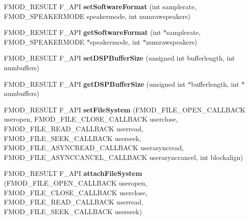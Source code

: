 \begin{DoxyCompactItemize}
\item 
\hypertarget{class_f_m_o_d_1_1_system_af45d03004a533319b4c56e2f13158531}{F\+M\+O\+D\+\_\+\+R\+E\+S\+U\+L\+T F\+\_\+\+A\+P\+I {\bfseries set\+Software\+Format} (int samplerate, F\+M\+O\+D\+\_\+\+S\+P\+E\+A\+K\+E\+R\+M\+O\+D\+E speakermode, int numrawspeakers)}\label{class_f_m_o_d_1_1_system_af45d03004a533319b4c56e2f13158531}

\item 
\hypertarget{class_f_m_o_d_1_1_system_a429d3d9c082329c16a5a827a9beab19f}{F\+M\+O\+D\+\_\+\+R\+E\+S\+U\+L\+T F\+\_\+\+A\+P\+I {\bfseries get\+Software\+Format} (int $\ast$samplerate, F\+M\+O\+D\+\_\+\+S\+P\+E\+A\+K\+E\+R\+M\+O\+D\+E $\ast$speakermode, int $\ast$numrawspeakers)}\label{class_f_m_o_d_1_1_system_a429d3d9c082329c16a5a827a9beab19f}

\item 
\hypertarget{class_f_m_o_d_1_1_system_af715ce88b8dd4b9653a09ba8ea7e7cfd}{F\+M\+O\+D\+\_\+\+R\+E\+S\+U\+L\+T F\+\_\+\+A\+P\+I {\bfseries set\+D\+S\+P\+Buffer\+Size} (unsigned int bufferlength, int numbuffers)}\label{class_f_m_o_d_1_1_system_af715ce88b8dd4b9653a09ba8ea7e7cfd}

\item 
\hypertarget{class_f_m_o_d_1_1_system_a2aa3e1c3193075a3dac5fd35361f8df5}{F\+M\+O\+D\+\_\+\+R\+E\+S\+U\+L\+T F\+\_\+\+A\+P\+I {\bfseries get\+D\+S\+P\+Buffer\+Size} (unsigned int $\ast$bufferlength, int $\ast$numbuffers)}\label{class_f_m_o_d_1_1_system_a2aa3e1c3193075a3dac5fd35361f8df5}

\item 
\hypertarget{class_f_m_o_d_1_1_system_a44b483cf478ab779944108f5ee724a77}{F\+M\+O\+D\+\_\+\+R\+E\+S\+U\+L\+T F\+\_\+\+A\+P\+I {\bfseries set\+File\+System} (F\+M\+O\+D\+\_\+\+F\+I\+L\+E\+\_\+\+O\+P\+E\+N\+\_\+\+C\+A\+L\+L\+B\+A\+C\+K useropen, F\+M\+O\+D\+\_\+\+F\+I\+L\+E\+\_\+\+C\+L\+O\+S\+E\+\_\+\+C\+A\+L\+L\+B\+A\+C\+K userclose, F\+M\+O\+D\+\_\+\+F\+I\+L\+E\+\_\+\+R\+E\+A\+D\+\_\+\+C\+A\+L\+L\+B\+A\+C\+K userread, F\+M\+O\+D\+\_\+\+F\+I\+L\+E\+\_\+\+S\+E\+E\+K\+\_\+\+C\+A\+L\+L\+B\+A\+C\+K userseek, F\+M\+O\+D\+\_\+\+F\+I\+L\+E\+\_\+\+A\+S\+Y\+N\+C\+R\+E\+A\+D\+\_\+\+C\+A\+L\+L\+B\+A\+C\+K userasyncread, F\+M\+O\+D\+\_\+\+F\+I\+L\+E\+\_\+\+A\+S\+Y\+N\+C\+C\+A\+N\+C\+E\+L\+\_\+\+C\+A\+L\+L\+B\+A\+C\+K userasynccancel, int blockalign)}\label{class_f_m_o_d_1_1_system_a44b483cf478ab779944108f5ee724a77}

\item 
\hypertarget{class_f_m_o_d_1_1_system_a1ba3740700c658162387ae161745e39a}{F\+M\+O\+D\+\_\+\+R\+E\+S\+U\+L\+T F\+\_\+\+A\+P\+I {\bfseries attach\+File\+System} (F\+M\+O\+D\+\_\+\+F\+I\+L\+E\+\_\+\+O\+P\+E\+N\+\_\+\+C\+A\+L\+L\+B\+A\+C\+K useropen, F\+M\+O\+D\+\_\+\+F\+I\+L\+E\+\_\+\+C\+L\+O\+S\+E\+\_\+\+C\+A\+L\+L\+B\+A\+C\+K userclose, F\+M\+O\+D\+\_\+\+F\+I\+L\+E\+\_\+\+R\+E\+A\+D\+\_\+\+C\+A\+L\+L\+B\+A\+C\+K userread, F\+M\+O\+D\+\_\+\+F\+I\+L\+E\+\_\+\+S\+E\+E\+K\+\_\+\+C\+A\+L\+L\+B\+A\+C\+K userseek)}\label{class_f_m_o_d_1_1_system_a1ba3740700c658162387ae161745e39a}


\end{DoxyCompactItemize}
